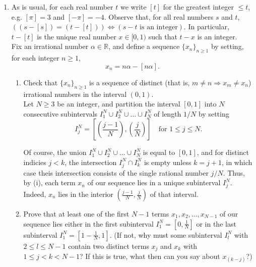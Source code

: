 \documentclass[11pt]{article}
\begin{document}
\begin{enumerate}[leftmargin=0pt, label=\arabic*)]
 \item As is usual, for each real number \(t\) we write \([t]\) for the greatest integer \(\leq t\), e.g. 
 \([\pi] = 3\) and \([-\pi] = -4\).  Observe that, for all real numbers \(s\) and \(t\), 
 \(((s - [s]) = (t - [t])) \Leftrightarrow (s - t \text{ is an integer})\).  In particular, \(t - [t]\) is 
 the unique real number \(x \in [0,1)\) such that \(t-x\) is an integer. \\

 Fix an irrational number \(\alpha \in \mathbb{R}\), and define a sequence \(\{x_n\}_{n \geq 1}\) by 
 setting, for each integer \(n \geq 1\), 
 \[x_n = n\alpha - [n\alpha].\]

 \begin{enumerate}[label=(\roman*)]
   \item Check that \(\{x_n\}_{n \geq 1}\) is a sequence of distinct (that is, \(m \neq n \Rightarrow 
     x_m \neq x_n\)) irrational numbers in the interval \((0,1)\). \\

     Let \(N \geq 3\) be an integer, and partition the interval \([0,1]\) into \(N\) consecutive subintervals
     \(I_1^N \cup I_2^N \cup \dots \cup I_N^N\) of length \(1/N\) by setting
     \[I_j^N = \left[\left(\frac{j-1}{N}\right), \left(\frac{j}{N}\right) \right] \quad \text{for } 1 \leq j \leq N.\]

     Of course, the union \(I_1^N \cup I_2^N \cup \dots \cup I_N^N\) is equal to \([0,1]\), and for distinct 
     indicies \(j < k\), the intersection \(I_j^N \cap I_k^N\) is empty unless \(k = j+1\), in which case 
     theis intersection consists of the single rational number \(j/N\).  Thus, by (i), each term \(x_n\) of 
     our sequence lies in a unique subinterval \(I_j^N\).  Indeed, \(x_n\) lies in the interior 
     \(\left(\frac{j-1}{N}, \frac{j}{N}\right)\) of that interval.

     
   \item Prove that at least one of the first \(N-1\) terms \(x_1, x_2, \dots, x_{N-1}\) of our sequence 
     lies either in the first subinterval \(I_1^N = \left[0,\frac{1}{N}\right]\) or in the last subinterval 
     \(I_1^N = \left[1-\frac{1}{N},1\right]\). (If not, why must some subinterval \(I_l^N\) with
     \(2 \leq l \leq N-1\) contain two distinct terms \(x_j\) and \(x_k\) with \(1 \leq j < k < N-1\)? 
     If this is true, what then can you say about \(x_{(k-j)}\)?)


\end{enumerate}
\end{enumerate}
\end{document}
